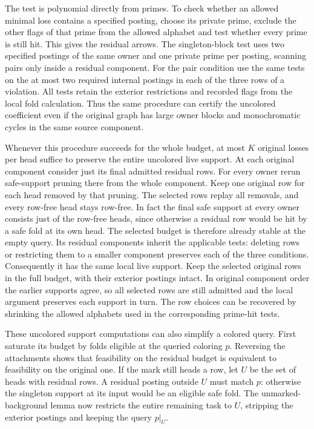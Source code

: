 The test is polynomial directly from primes. To check
whether an allowed minimal loss contains a specified
posting, choose its private prime, exclude the other
flags of that prime from the allowed alphabet and test
whether every prime is still hit. This gives the residual
arrows. The singleton-block test uses two specified
postings of the same owner and one private prime per
posting, scanning pairs only inside a residual component.
For the pair condition use the same tests on the at most
two required internal postings in each of the three rows
of a violation.
All tests retain the exterior restrictions and recorded
flags from the local fold calculation. Thus the same
procedure can certify the uncolored coefficient even if
the original graph has large owner blocks and
monochromatic cycles in the same source component.

Whenever this procedure succeeds for the whole budget,
at most $K$ original losses per head suffice to preserve
the entire uncolored live support. At each original
component consider just its final admitted residual rows.
For every owner rerun safe-support pruning there from
the whole component. Keep one original row for each
head removed by that pruning. The selected rows replay
all removals, and every row-free head stays row-free.
In fact the final safe support at every owner consists
just of the row-free heads, since otherwise a residual
row would be hit by a safe fold at its own head.
The selected budget is therefore already stable at the
empty query. Its residual components inherit the
applicable tests: deleting rows or restricting them to
a smaller component preserves each of the three
conditions. Consequently it has the same local live
support. Keep the selected original rows in the full
budget, with their exterior postings intact. In original
component order the earlier supports agree, so all
selected rows are still admitted and the local argument
preserves each support in turn. The row choices can be
recovered by shrinking the allowed alphabets used in
the corresponding prime-hit tests.

These uncolored support computations can also simplify
a colored query. First saturate its budget by folds
eligible at the queried coloring $p$. Reversing the
attachments shows that feasibility on the residual
budget is equivalent to feasibility on the original
one. If the mark still heads a row, let $U$ be the
set of heads with residual rows. A residual posting
outside $U$ must match $p$: otherwise the singleton
support at its input would be an eligible safe fold.
The unmarked-background lemma now restricts the
entire remaining task to $U$, stripping the exterior
postings and keeping the query $p|_U$.

